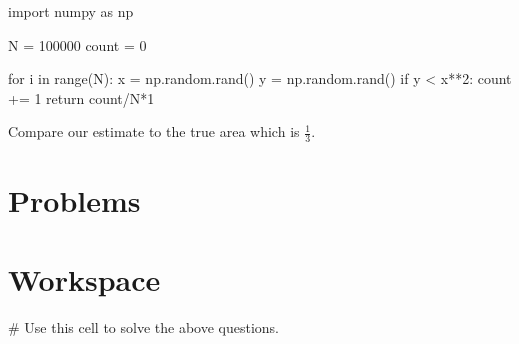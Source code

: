 \documentclass{ximera}
\begin{document}
\begin{sageCell}
import numpy as np

N = 100000
count = 0

for i in range(N):
        x = np.random.rand()
        y = np.random.rand()
        if y < x**2:
                count += 1
return count/N*1
\end{sageCell}

Compare our estimate to the true area which is $\frac{1}{3}$.

\section{Problems}

\begin{question}
\end{question}

\begin{question}
\end{question}

\begin{question}
\end{question}

\section{Workspace}

\begin{sageCell}
# Use this cell to solve the above questions.
\end{sageCell}
\end{document}

